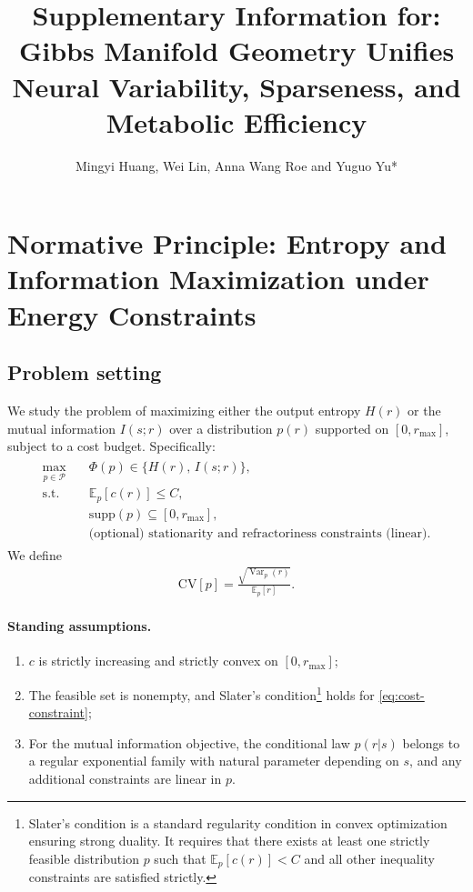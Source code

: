 \documentclass[11pt]{article}
\title{\textbf{Supplementary Information for:}\\
Gibbs Manifold Geometry Unifies Neural Variability, Sparseness, and Metabolic Efficiency}
\author{Mingyi Huang, Wei Lin, Anna Wang Roe and Yuguo Yu*}
\date{}
\DeclareMathOperator{\Var}{Var}
\theoremstyle{remark}
\theoremstyle{definition}
\begin{document}
\maketitle

\tableofcontents

\newpage
\section{Normative Principle: Entropy and Information Maximization under Energy Constraints}

\subsection{Problem setting}

We study the problem of maximizing either the output entropy $H(r)$ or the mutual information $I(s;r)$ over a distribution $p(r)$ supported on $[0,r_{\max}]$, subject to a cost budget. Specifically:
\begin{align}
\begin{split}
\max_{p \in \mathcal{P}} \quad & \Phi(p) \in \{ H(r),\, I(s;r)\}, \\
\text{s.t.}\quad & \mathbb{E}_p[c(r)] \le C, \label{eq:cost-constraint} \\
& \mathrm{supp}(p)\subseteq [0,r_{\max}], \\
& \text{(optional) stationarity and refractoriness constraints (linear)}.
\end{split}
\end{align}
We define
\begin{align}
\mathrm{CV}[p] = \frac{\sqrt{\Var_p(r)}}{\mathbb{E}_p[r]}.
\end{align}

\paragraph{Standing assumptions.}
\begin{enumerate}[label=(A\arabic*)]
  \item $c$ is strictly increasing and strictly convex on $[0,r_{\max}]$;
  \item The feasible set is nonempty, and Slater's condition\footnote{Slater’s condition is a standard regularity condition in convex optimization ensuring strong duality. 
  It requires that there exists at least one strictly feasible distribution $p$ such that $\mathbb{E}_p[c(r)]<C$ and all other inequality constraints are satisfied strictly.} holds for \eqref{eq:cost-constraint};
  \item For the mutual information objective, the conditional law $p(r|s)$ belongs to a regular exponential family with natural parameter depending on $s$, and any additional constraints are linear in $p$.
\end{enumerate}
\end{document}
